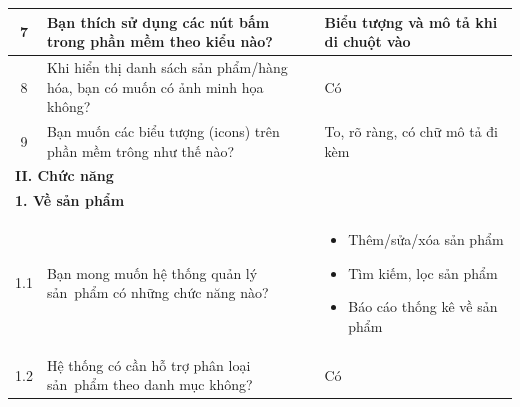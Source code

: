 \documentclass[a4paper,12pt]{report}
\begin{document}
\begin{longtable}{|c|p{8cm}|p{7cm}|}
    \hline
    7            & Bạn thích sử dụng các nút bấm trong phần mềm theo kiểu nào?                                                             & Biểu tượng và mô tả khi di chuột vào                                                                                     \\
    \hline
    8            & Khi hiển thị danh sách sản phẩm/hàng hóa, bạn có muốn có ảnh minh họa không?                                            & Có                                                                                                                       \\
    \hline
    9            & Bạn muốn các biểu tượng (icons) trên phần mềm trông như thế nào?                                                        & To, rõ ràng, có chữ mô tả đi kèm                                                                                         \\
    \hline
    \multicolumn{3}{|l|}{\textbf{II. Chức năng}}                                                                                                                                                                                                                      \\
    \hline
    \multicolumn{3}{|l|}{\textbf{1. Về sản phẩm}}                                                                                                                                                                                                                     \\
    \hline
    1.1          & Bạn mong muốn hệ thống quản lý sản~phẩm có những chức năng nào?                                                         &
    \begin{itemize}
        \item Thêm/sửa/xóa sản phẩm
        \item Tìm kiếm, lọc sản phẩm
        \item Báo cáo thống kê về sản phẩm
    \end{itemize}                                                                                                                                                                                                                                 \\
    \hline
    1.2          & Hệ thống có cần hỗ trợ phân loại sản~phẩm theo danh mục không?                                                          & Có                                                                                                                       \\

\end{longtable}
\end{document}
